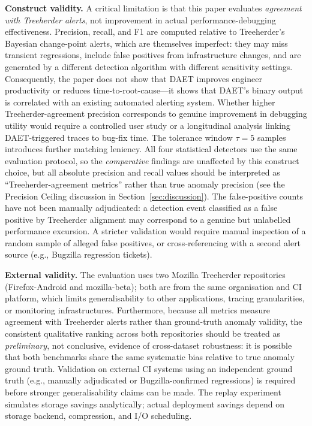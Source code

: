 \documentclass[pdflatex,sn-nature]{sn-jnl}
\theoremstyle{thmstyleone}%
\begin{document}
\textbf{Construct validity.}
A critical limitation is that this paper evaluates \emph{agreement with
Treeherder alerts}, not improvement in actual performance-debugging
effectiveness.
Precision, recall, and F1 are computed relative to Treeherder's Bayesian
change-point alerts, which are themselves imperfect: they may miss
transient regressions, include false positives from infrastructure changes,
and are generated by a different detection algorithm with different
sensitivity settings.
Consequently, the paper does not show that DAET improves engineer
productivity or reduces time-to-root-cause---it shows that DAET's
binary output is correlated with an existing automated alerting system.
Whether higher Treeherder-agreement precision corresponds to genuine
improvement in debugging utility would require a controlled user study or
a longitudinal analysis linking DAET-triggered traces to bug-fix time.
The tolerance window $\tau = 5$ samples introduces further matching
leniency.
All four statistical detectors use the same evaluation protocol, so the \emph{comparative}
findings are unaffected by this construct choice, but all absolute
precision and recall values should be interpreted as
``Treeherder-agreement metrics'' rather than true anomaly precision
(see the Precision Ceiling discussion in Section~\ref{sec:discussion}).
The false-positive counts have not been manually adjudicated: a detection
event classified as a false positive by Treeherder alignment may correspond
to a genuine but unlabelled performance excursion.
A stricter validation would require manual inspection of a random sample of
alleged false positives, or cross-referencing with a second alert source
(e.g., Bugzilla regression tickets).

\textbf{External validity.}
The evaluation uses two Mozilla Treeherder repositories (Firefox-Android and
mozilla-beta); both are from the same organisation and CI platform, which
limits generalisability to other applications, tracing granularities,
or monitoring infrastructures.
Furthermore, because all metrics measure agreement with Treeherder alerts
rather than ground-truth anomaly validity, the consistent qualitative ranking
across both repositories should be treated as \emph{preliminary}, not
conclusive, evidence of cross-dataset robustness: it is possible that
both benchmarks share the same systematic bias relative to true anomaly
ground truth.
Validation on external CI systems using an independent ground truth
(e.g., manually adjudicated or Bugzilla-confirmed regressions) is
required before stronger generalisability claims can be made.
The replay experiment simulates storage savings analytically; actual
deployment savings depend on storage backend, compression, and I/O scheduling.
\end{document}
